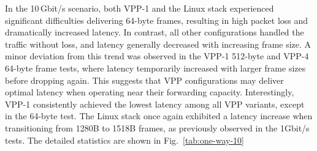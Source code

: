 In the 10\,Gbit/s scenario, both VPP-1 and the Linux stack experienced significant difficulties delivering 64-byte frames, resulting in high packet loss and dramatically increased latency.
In contrast, all other configurations handled the traffic without loss, and latency generally decreased with increasing frame size.
A minor deviation from this trend was observed in the VPP-1 512-byte and VPP-4 64-byte frame tests, where latency temporarily increased with larger frame sizes before dropping again.
This suggests that VPP configurations may deliver optimal latency when operating near their forwarding capacity.
Interestingly, VPP-1 consistently achieved the lowest latency among all VPP variants, except in the 64-byte test.
The Linux stack once again exhibited a latency increase when transitioning from 1280B to 1518B frames, as previously observed in the 1Gbit/s tests.
The detailed statistics are shown in Fig.~\ref{tab:one-way-10}

